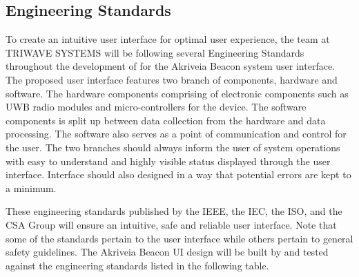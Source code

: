 

\subsection{Engineering Standards}
\bigskip
To create an intuitive user interface for optimal user experience, the team at TRIWAVE SYSTEMS will be following several Engineering Standards throughout the development of for the Akriveia Beacon system user interface. The proposed user interface features two branch of components, hardware and software. The hardware components comprising of electronic components such as UWB radio modules and micro-controllers for the device. The software components is split up between data collection from the hardware and data processing. The software also serves as a point of communication and control for the user. The two branches should always inform the user of system operations with easy to understand and highly visible status displayed through the user interface. Interface should also designed in a way that potential errors are kept to a minimum.

\bigskip
These engineering standards published by the IEEE, the IEC, the ISO, and the CSA Group will ensure an intuitive, safe and reliable user interface. Note that some of the standards pertain to the user interface while others pertain to general safety guidelines. The Akriveia Beacon UI design will be built by and tested against the engineering standards listed in the following table.
\bigskip

